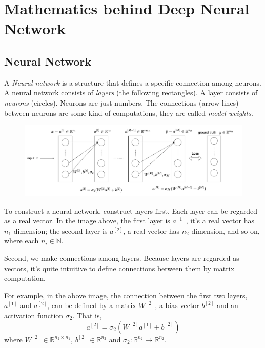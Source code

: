 \documentclass[../main.tex]{subfiles}
\begin{document}
    \section{Mathematics behind Deep Neural Network}
        \subsection{Neural Network}
            A \textit{Neural network} is a structure that defines a specific connection among neurons.
            A neural network consists of \textit{layers} (the following rectangles). A layer consists of
            \textit{neurons} (circles). Neurons are just numbers. The connections (arrow lines) between neurons are
            some kind of computations, they are called \textit{model weights}.
            
            \begin{figure}[h]
                    \includegraphics[width=\textwidth]{DNN.png}
                    \centering
            \end{figure}
            
            To construct a neural network, construct layers first.
            Each layer can be regarded as a real vector.
            In the image above, the first layer is $a^{[1]}$, it's a real vector has $n_1$ dimension; the second layer is $a^{[2]}$, a real vector has $n_2$ dimension, and so on, where each $n_i \in \mathbb{N}$.
            
            Second, we make connections among layers.
            Because layers are regarded as vectors, it's quite intuitive to define connections between them by matrix computation.
             
            For example, in the above image, the connection between the first two layers, $a^{[1]}$ and $a^{[2]}$, can be defined by a matrix $W^{[2]}$, a bias vector $b^{[2]}$ and an activation function $\sigma_2$. That is,
            \[
                a^{[2]} = \sigma_2(W^{[2]} a^{[1]} + b^{[2]})
            \]
            where $W^{[2]} \in \mathbb{R}^{n_2 \times n_1}$, $b^{[2]} \in \mathbb{R}^{n_2}$ and $\sigma_2: \mathbb{R}^{n_2} \rightarrow \mathbb{R}^{n_2}$.
            
\end{document}
